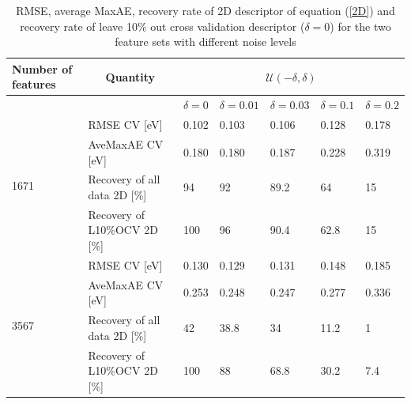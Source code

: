 \documentclass[11pt,oneside,czech,american]{book} %
\theoremstyle{definition} %
\theoremstyle{definition}
\begin{document}
\begin{table}[H]
	\centering
	\label{sense_E}
	\begin{tabular}{lllllll} 
		\hline
		Number of features    & \multicolumn{1}{c}{Quantity} & \multicolumn{5}{c}{$\mathcal{U}(-\delta, \delta)$}          \\ 
		\hline
		& \multicolumn{1}{c}{}         & $\delta=0$     & $\delta=0.01$  & $\delta=0.03$  & $\delta=0.1$   & $\delta=0.2$    \\ 
		\hline
		\multirow{4}{*}{1671} & RMSE CV [eV]                  & 0.102 & 0.103 & 0.106 & 0.128 & 0.178  \\ 		
		& AveMaxAE CV [eV]              & 0.180 & 0.180 & 0.187 & 0.228 & 0.319  \\ 		
		& Recovery of all data 2D [\%]  & 94    & 92    & 89.2  & 64    & 15     \\ 		
		& Recovery of L10\%OCV 2D [\%]  & 100   & 96    & 90.4  & 62.8  & 15     \\ 
		\hline
		\multirow{4}{*}{3567} & RMSE CV [eV]                  & 0.130 & 0.129 & 0.131 & 0.148 & 0.185  \\ 
		
		& AveMaxAE CV [eV]              & 0.253 & 0.248 & 0.247 & 0.277 & 0.336  \\ 
		
		& Recovery of all data 2D [\%]  & 42    & 38.8  & 34    & 11.2  & 1      \\ 
		
		& Recovery of L10\%OCV 2D [\%]  & 100   & 88    & 68.8  & 30.2  & 7.4    \\
		\hline
	\end{tabular}
	\caption{RMSE, average MaxAE, recovery rate of 2D descriptor of equation (\ref{2D}) and recovery rate of leave 10\% out cross validation descriptor ($\delta=0$) for the two feature sets with different noise levels}
\end{table}
\end{document}
